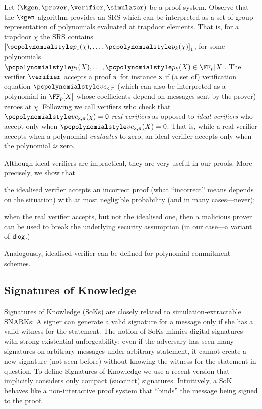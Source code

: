  Let
$(\kgen, \prover, \verifier, \simulator)$ be a proof system.
Observe that the $\kgen$ algorithm provides an SRS which can be interpreted as a set
of group representation of polynomials evaluated at trapdoor elements. That is, for a
trapdoor $\chi$ the SRS contains $\gone{\p{p_1}(\chi), \ldots, \p{p_k}(\chi)}$, for
some polynomials $\p{p_1}(X), \ldots, \p{p_k}(X) \in \FF_p[X]$. The verifier
$\verifier$ accepts a proof $\pi$ for instance $\mathsf{x}$ if (a set of) verification
equation $\vereq_{\inp, \zkproof}$ (which can also be interpreted as a polynomial in
$\FF_p[X]$ whose coefficients depend on messages sent by the prover) zeroes at
$\chi$. Following \cite{EPRINT:GabWilCio19} we call verifiers who check that
$\vereq_{\inp, \zkproof}(\chi) = 0$ \emph{real verifiers} as opposed to \emph{ideal
  verifiers} who accept only when $\vereq_{\inp, \zkproof}(X) = 0$. That is, while a
real verifier accepts when a polynomial \emph{evaluates} to zero, an ideal verifier
accepts only when the polynomial \emph{is} zero.

Although ideal verifiers are impractical, they are very useful in our
proofs. More precisely, we show that
\begin{compactenum}
\item the idealised verifier accepts an incorrect proof (what ``incorrect''
  means depends on the situation) with at most negligible probability (and in many
  cases---never);
\item when the real verifier accepts, but not the idealised one, then a malicious
  prover can be used to break the underlying security assumption (in our case---a
  variant of $\mathsf{dlog}$.)
\end{compactenum}

Analogously, idealised verifier can be defined for polynomial commitment schemes.

 
\subsection{Signatures of Knowledge}
Signatures of Knowledge (SoKs) \cite{C:ChaLys06} are closely related to
simulation-extractable SNARKs: A signer can generate a valid signature for a message
only if she has a valid witness for the statement.
%
The notion of SoKs mimics digital signatures with strong existential unforgeability:
even if the adversary has seen many signatures on arbitrary messages under arbitrary
statement, it cannot create a new signature (not seen before) without knowing the
witness for the statement in question.
%
To define Signatures of Knowledge we use a recent version \cite{C:GroMal17} that
implicitly considers only compact (succinct) signatures.  Intuitively, a SoK behaves like a non-interactive proof system
that ``binds'' the message being signed to the proof.
     
